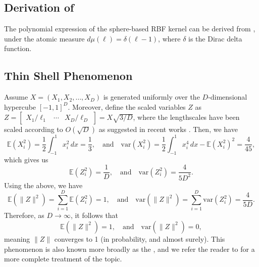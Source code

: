 \documentclass[twoside]{article}
\theoremstyle{plain}
\theoremstyle{definition}
\begin{document}
\subsection{Derivation of } \label{app:taylor-exp}
The polynomial expression of the sphere-based RBF kernel can be derived from ,
under the atomic measure $d\mu(\ell) = \delta(\ell - 1)$, where $\delta$ is the Dirac delta function.

\subsection{Thin Shell Phenomenon} \label{app:gaussian-annulus}
Assume $X = (X_1, X_2, \ldots, X_D)$ is generated uniformly over the $D$-dimensional hypercube $[-1,1]^D$. Moreover, define the scaled variables $Z$ as $Z = \begin{bmatrix} X_1/\ell_1 & \cdots & X_D/\ell_D \end{bmatrix} = X \sqrt{3/D}$, where the lengthscales have been scaled according to $O(\sqrt{D})$ as suggested in recent works \citep{hvarfner2024vanilla, xu2025standard, papenmeier2025understanding}. Then, we have
\begin{equation*}
    \mathbb{E}\left(X_i^2\right) = \frac{1}{2}\int_{-1}^1 x_i^2 \, dx = \frac{1}{3}, \quad \text{and} \quad
    \textrm{var}\left(X_i^2\right) = \frac{1}{2}\int_{-1}^1 x_i^4 \, dx - \mathbb{E}\left(X_i^2\right)^2 = \frac{4}{45},
\end{equation*}
which gives us
\begin{equation*}
    \mathbb{E}\left(Z_i^2\right) = \frac{1}{D}, \quad \text{and} \quad
    \textrm{var}\left(Z_i^2\right) = \frac{4}{5D^2}.
\end{equation*}
Using the above, we have
\begin{equation*}
    \mathbb{E}\left(\|Z\|^2\right) = \sum_{i=1}^{D} \mathbb{E}\left(Z_i^2\right) = 1, \quad \text{and} \quad
    \mathrm{var}\left(\|Z\|^2\right) = \sum_{i=1}^{D} \textrm{var}\left(Z_i^2\right) = \frac{4}{5D}.
\end{equation*}
Therefore, as $D \rightarrow \infty$, it follows that 
\begin{equation*}
    \mathbb{E}\left(\|Z\|^2\right) = 1, \quad \text{and} \quad
    \mathrm{var}\left(\|Z\|^2\right) = 0,
\end{equation*}
meaning $\|Z\|$ converges to 1 (in probability, and almost surely). This phenomenon is also known more broadly as the , and we refer the reader to \cite{vershynin2025high} for a more complete treatment of the topic.
\end{document}
